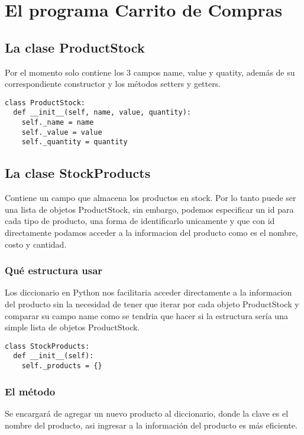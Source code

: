 \section{El programa Carrito de Compras}
\subsection{La clase ProductStock}
Por el momento solo contiene los 3 campos name, value y quatity, además de su correspondiente constructor y los métodos setters y getters.

\begin{verbatim}
class ProductStock:
  def __init__(self, name, value, quantity):
    self._name = name
    self._value = value
    self._quantity = quantity
\end{verbatim}

\subsection{La clase StockProducts}
Contiene un campo que almacena los productos en stock. Por lo tanto puede ser una lista de objetos ProductStock, sin embargo, podemos especificar un id para cada tipo de producto, una forma de identificarlo unicamente y que con id directamente podamos acceder a la informacion del producto como es el nombre, costo y cantidad.

\subsubsection{Qué estructura usar}
Los diccionario en Python nos facilitaria acceder directamente a la informacion del producto sin la necesidad de tener que iterar por cada objeto ProductStock y comparar su campo name como se tendria que hacer si la estructura sería una simple lista de objetos ProductStock.

\begin{verbatim}
class StockProducts:
  def __init__(self):
    self._products = {}
\end{verbatim}

\subsubsection{El método }
Se encargará de agregar un nuevo producto al diccionario, donde la clave es el nombre del producto, asi ingresar a la información del producto es más eficiente.

